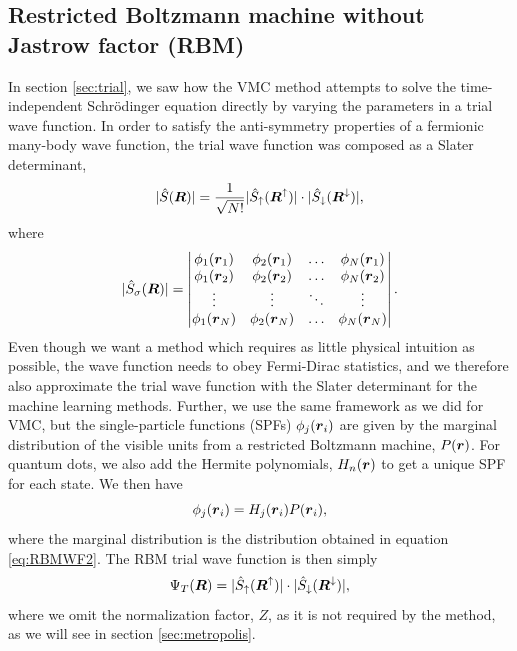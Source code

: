\subsection{Restricted Boltzmann machine without Jastrow factor (RBM)} \label{sec:rbm}
In section \ref{sec:trial}, we saw how the VMC method attempts to solve the time-independent Schrödinger equation directly by varying the parameters in a trial wave function. In order to satisfy the anti-symmetry properties of a fermionic many-body wave function, the trial wave function was composed as a Slater determinant,
\begin{equation}
|\hat{S}(\boldsymbol{{R}})|=\frac{1}{\sqrt{N!}}|\hat{S}_{\uparrow}(\boldsymbol{{R}}^{\uparrow})|\cdot |\hat{S}_{\downarrow}(\boldsymbol{{R}}^{\downarrow})|,
\end{equation}
where
\begin{equation}
|\hat{S}_{\sigma}(\boldsymbol{{R}})|=
\begin{vmatrix}
\phi_1(\boldsymbol{r}_1) & \phi_2(\boldsymbol{r}_1) & \hdots & \phi_N(\boldsymbol{r}_1)\\
\phi_1(\boldsymbol{r}_2) & \phi_2(\boldsymbol{r}_2) & \hdots & \phi_N(\boldsymbol{r}_2)\\
\vdots & \vdots & \ddots & \vdots \\
\phi_1(\boldsymbol{r}_N) & \phi_2(\boldsymbol{r}_N) & \hdots & \phi_N(\boldsymbol{r}_N)
\end{vmatrix}.
\end{equation}
Even though we want a method which requires as little physical intuition as possible, the wave function needs to obey Fermi-Dirac statistics, and we therefore also approximate the trial wave function with the Slater determinant for the machine learning methods. Further, we use the same framework as we did for VMC, but the single-particle functions (SPFs) $\phi_j(\boldsymbol{{r}}_i)$ are given by the marginal distribution of the visible units from a restricted Boltzmann machine, $P(\boldsymbol{{r}})$. For quantum dots, we also add the Hermite polynomials, $H_n(\boldsymbol{{r}})$ to get a unique SPF for each state. We then have
\begin{equation}
\phi_j(\boldsymbol{{r}}_i)=H_j(\boldsymbol{{r}}_i)P(\boldsymbol{{r}}_i),
\end{equation}
where the marginal distribution is the distribution obtained in equation \eqref{eq:RBMWF2}. The RBM trial wave function is then simply
\begin{equation}
\Psi_T(\boldsymbol{{R}})=|\hat{S}_{\uparrow}(\boldsymbol{{R}}^{\uparrow})|\cdot |\hat{S}_{\downarrow}(\boldsymbol{{R}}^{\downarrow})|,
\end{equation}
where we omit the normalization factor, $Z$, as it is not required by the method, as we will see in section \ref{sec:metropolis}.

